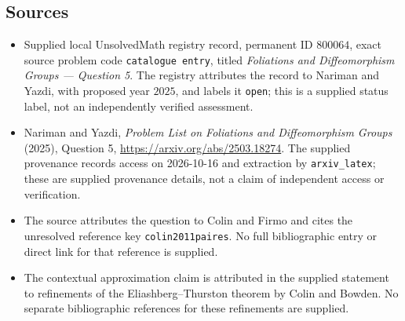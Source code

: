 \documentclass[11pt]{article}
\begin{document}
\subsection{Sources}
\begin{itemize}
\item Supplied local UnsolvedMath registry record, permanent ID \(800064\), exact source problem code \texttt{catalogue entry}, titled \emph{Foliations and Diffeomorphism Groups --- Question 5}. The registry attributes the record to Nariman and Yazdi, with proposed year \(2025\), and labels it \texttt{open}; this is a supplied status label, not an independently verified assessment.
\item Nariman and Yazdi, \emph{Problem List on Foliations and Diffeomorphism Groups} (2025), Question 5, \url{https://arxiv.org/abs/2503.18274}. The supplied provenance records access on 2026-10-16 and extraction by \texttt{arxiv\_latex}; these are supplied provenance details, not a claim of independent access or verification.
\item The source attributes the question to Colin and Firmo and cites the unresolved reference key \texttt{colin2011paires}. No full bibliographic entry or direct link for that reference is supplied.
\item The contextual approximation claim is attributed in the supplied statement to refinements of the Eliashberg--Thurston theorem by Colin and Bowden. No separate bibliographic references for these refinements are supplied.
\end{itemize}
\end{document}
